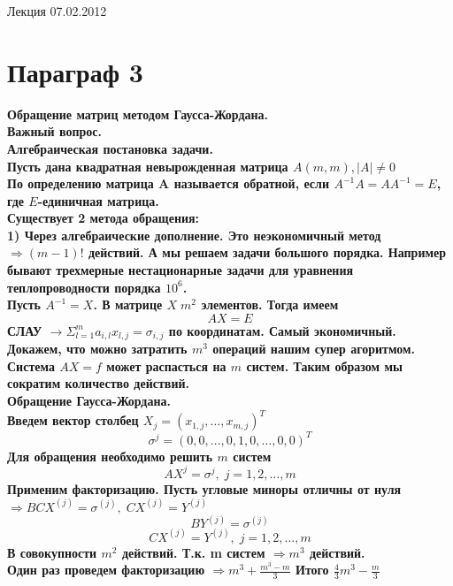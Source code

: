 \documentclass[oneside, final, 14pt]{extreport}
\begin{document}
Лекция 07.02.2012
\section{Параграф 3}
\bfseries Обращение матриц методом Гаусса-Жордана.
\\
\normalfont
Важный вопрос.
\\
Алгебраическая постановка задачи.
\\
Пусть дана квадратная невырожденная матрица \(A (m,m), \mid A \mid \neq 0\)
\\
По определению матрица A называется обратной, если \(A^{-1}A=AA^{-1}=E\), где \(E\)-единичная матрица.
\\
Существует 2 метода обращения:
\\
1) Через алгебраические дополнение. Это неэкономичный метод \(\Rightarrow (m-1)!\) действий. А мы решаем задачи большого порядка. Например бывают трехмерные нестационарные задачи для уравнения теплопроводности порядка \(10^6\).
\\
Пусть \(A^{-1}=X\). В матрице \( X \; m^2\) элементов. Тогда имеем \begin{equation}AX=E\end{equation}
СЛАУ \( \rightarrow \Sigma_{l=1}^{m}a_{i,l}x_{l,j}=\sigma_{i,j} \) по координатам. Самый экономичный. Докажем, что можно затратить \(m^3\) операций нашим супер агоритмом.
\\
Система \(AX=f\) может распасться на \(m\) систем. Таким образом мы сократим количество действий.
\\
Обращение Гаусса-Жордана. 
\\
Введем вектор столбец \(X_j=(x_{1,j},\ldots ,x_{m,j})^T\)
\[ \sigma^{j}=(0, 0, \ldots,  0, 1, 0, \ldots, 0, 0)^T \]
Для обращения необходимо решить \(m\) систем 
\begin{equation} AX^j= \sigma^j, \; j=1, 2, \ldots , m \end{equation} 
Применим факторизацию. Пусть угловые миноры отличны от нуля \(\Rightarrow BCX^{(j)}=\sigma^{(j)}, \; CX^{(j)}=Y^{(j)}\)
\begin{equation} BY^{(j)}=\sigma^{(j)}\end{equation}
\begin{equation} CX^{(j)}=Y^{(j)}, \; j=1, 2, \ldots ,m \end{equation}
В совокупности \( m^2\) действий. Т.к.  m систем \(\Rightarrow m^3\) действий.
\\
Один раз проведем факторизацию \( \Rightarrow m^3+\frac{m^3-m}{3}\) Итого \( \frac{4}{3}m^3-\frac{m}{3}\)
\end{document}
